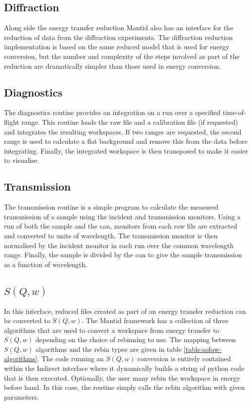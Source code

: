 \documentclass[paper=a4, fontsize=11pt]{scrartcl}	%
\numberwithin{equation}{section}															%
\numberwithin{figure}{section}																%
\numberwithin{table}{section}																%
\begin{document}
\subsection{Diffraction}
Along side the energy transfer reduction Mantid also has an interface for the reduction of data from the diffraction experiments. The diffraction reduction implementation is based on the same reduced model that is used for energy conversion, but the number and complexity of the steps involved as part of the reduction are dramatically simpler than those used in energy conversion. 

\subsection{Diagnostics}
The diagnostics routine provides an integration on a run over a specified time-of-flight range. This routine loads the raw file and a calibration file (if requested) and integrates the resulting workspaces. If two ranges are requested, the second range is used to calculate a flat background and remove this from the data before integrating. Finally, the integrated workspace is then transposed to make it easier to visualise.

\subsection{Transmission}
The transmission routine is a simple program to calculate the measured transmission of a sample using the incident and transmission monitors. Using a run of both the sample and the can, monitors from each  raw file are extracted and converted to units of wavelength. The transmission monitor is then normalised by the incident monitor in each run over the common wavelength range. Finally, the sample is divided by the can to give the sample transmission as a function of wavelength.

\subsection{$S(Q,w)$}
In this interface, reduced files created as part of an energy transfer reduction can be converted to $S(Q,w)$. The Mantid framework has a collection of three algorithms that are used to convert a workspace from energy transfer to $S(Q,w)$ depending on the choice of rebinning to use. The mapping between $S(Q,w)$ algorithms and the rebin types are given in table \ref{table:sofqw-algorithms}. The code running an $S(Q,w)$ conversion is entirely contained within the Indirect interface where it dynamically builds a string of python code that is then executed. Optionally, the user many rebin the workspace in energy before hand. In this case, the routine simply calls the rebin algorithm with given parameters.
\end{document}
